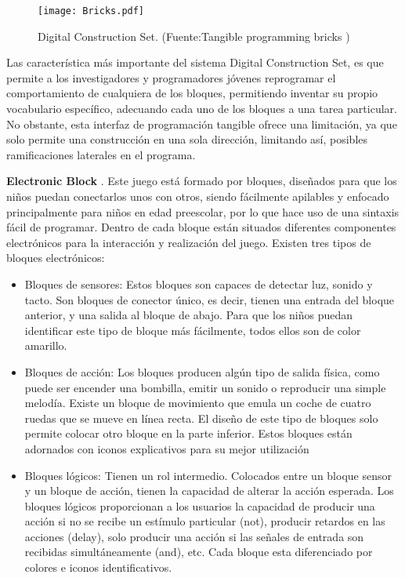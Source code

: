 \begin{figure}[!h]
\begin{center}
\texttt{[image: Bricks.pdf]}
\caption{Digital Construction Set. (Fuente:Tangible programming bricks \cite{McNerneyBricks})}
\label{fig:Bricks}
\end{center}
\end{figure}

Las característica más importante del sistema Digital Construction Set, es que permite a los investigadores y programadores jóvenes reprogramar el comportamiento de cualquiera de los bloques, permitiendo inventar su propio vocabulario específico, adecuando cada uno de los bloques a una tarea particular.
No obstante, esta interfaz de programación tangible ofrece una limitación, ya que solo permite una construcción en una sola dirección, limitando así, posibles ramificaciones laterales en el programa.


\textbf{Electronic Block} \cite{Wyeth}. Este juego está formado por bloques, diseñados para que los niños puedan conectarlos unos con otros, siendo fácilmente apilables y enfocado principalmente para niños en edad preescolar, por lo que hace uso de una sintaxis fácil de programar. Dentro de cada bloque están situados diferentes componentes electrónicos para la interacción y realización del juego.
Existen tres tipos de bloques electrónicos:
\begin{itemize}
\item Bloques de sensores: Estos bloques son capaces de detectar luz, sonido y tacto. Son bloques de conector único, es decir, tienen una entrada del bloque anterior, y una salida al bloque de abajo. Para que los niños puedan identificar este tipo de bloque más fácilmente, todos ellos son de color amarillo.
\item Bloques de acción: Los bloques producen algún tipo de salida física, como puede ser encender una bombilla, emitir un sonido o reproducir una simple melodía. Existe un bloque de movimiento que emula un coche de cuatro ruedas que se mueve en línea recta.
El diseño de este tipo de bloques solo permite colocar otro bloque en la parte inferior. Estos bloques están adornados con iconos explicativos para su mejor utilización
\item Bloques lógicos:  Tienen un rol intermedio. Colocados entre un bloque sensor y un bloque de acción, tienen la capacidad de alterar la acción esperada. Los bloques lógicos proporcionan a los usuarios la capacidad de producir una acción si no se recibe un estímulo particular (not), producir retardos en las acciones (delay), solo producir una acción si las señales de entrada son recibidas simultáneamente (and), etc.
Cada bloque esta diferenciado por colores e iconos identificativos.
\end{itemize}

